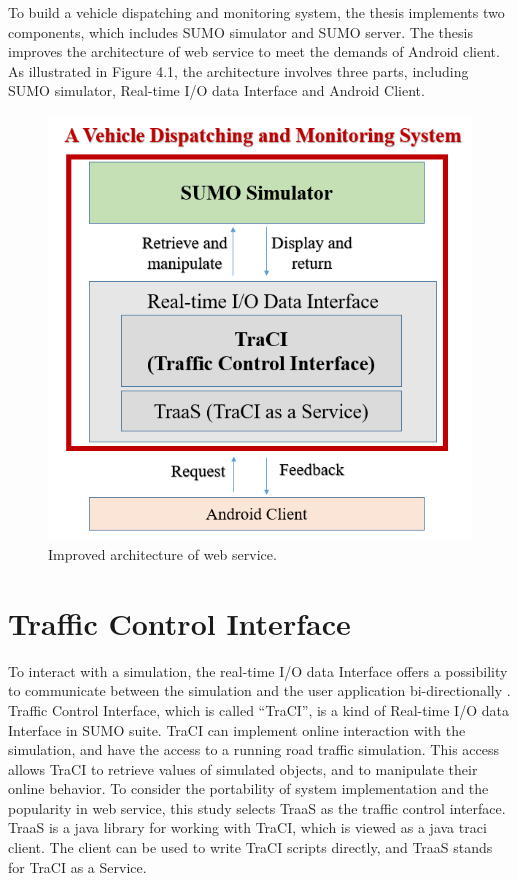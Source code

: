 \documentclass[12pt]{ksthesis}
\begin{document}
\begin{thesis}
{To build a vehicle dispatching and monitoring system, the thesis implements two components, which includes SUMO simulator and SUMO server. The thesis improves the architecture of web service to meet the demands of Android client.
As illustrated in Figure 4.1, the architecture involves three parts, including SUMO simulator, Real-time I/O data Interface and Android Client.



\begin{figure}[t!]
\centering
\includegraphics[scale=0.55]{./Thesis_figures/F4-1_webService_arcitecture.PNG}
\caption{\large Improved architecture of web service.}
\vspace{0.5cm}
\label{Fig:Improved_architecture_of_web_service}
\end{figure}



\section{Traffic Control Interface}
To interact with a simulation, the real-time I/O data Interface offers a possibility to communicate between the simulation and the user application bi-directionally \cite{wegener2008traci}. Traffic Control Interface, which is called “TraCI”, is a kind of Real-time I/O data Interface in SUMO suite.
TraCI can implement online interaction with the simulation, and have the access to a running road traffic simulation. This access allows TraCI to retrieve values of simulated objects, and to manipulate their online behavior.
To consider the portability of system implementation and the popularity in web service, this study selects TraaS as the traffic control interface. TraaS is a java library for working with TraCI, which is viewed as a java traci client. The client can be used to write TraCI scripts directly, and TraaS stands for TraCI as a Service.

}
\end{thesis}
\end{document}
